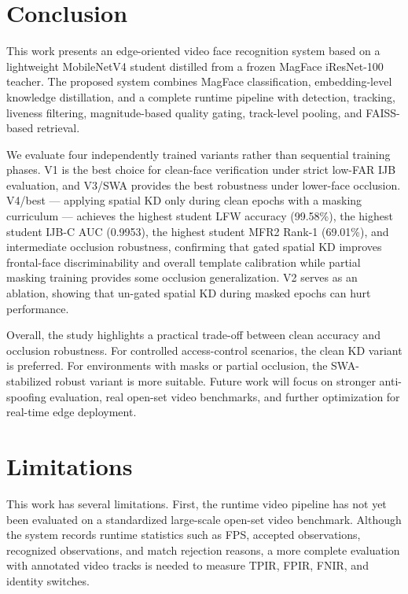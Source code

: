 \section{Conclusion}

This work presents an edge-oriented video face recognition system based on a lightweight MobileNetV4 student distilled from a frozen MagFace iResNet-100 teacher. The proposed system combines MagFace classification, embedding-level knowledge distillation, and a complete runtime pipeline with detection, tracking, liveness filtering, magnitude-based quality gating, track-level pooling, and FAISS-based retrieval\cite{mobilenetv4}\cite{relationalkd}\cite{hinton2015distilling}\cite{faiss}\cite{botsort}\cite{deepsort}.

We evaluate four independently trained variants rather than sequential training phases. V1 is the best choice for clean-face verification under strict low-FAR IJB evaluation, and V3/SWA provides the best robustness under lower-face occlusion. V4/best — applying spatial KD only during clean epochs with a masking curriculum — achieves the highest student LFW accuracy (99.58\%), the highest student IJB-C AUC (0.9953), the highest student MFR2 Rank-1 (69.01\%), and intermediate occlusion robustness, confirming that gated spatial KD improves frontal-face discriminability and overall template calibration while partial masking training provides some occlusion generalization. V2 serves as an ablation, showing that un-gated spatial KD during masked epochs can hurt performance\cite{izmailov2019averagingweightsleadswider}\cite{ijbb}\cite{ijbc}\cite{faiss}.

Overall, the study highlights a practical trade-off between clean accuracy and occlusion robustness. For controlled access-control scenarios, the clean KD variant is preferred. For environments with masks or partial occlusion, the SWA-stabilized robust variant is more suitable. Future work will focus on stronger anti-spoofing evaluation, real open-set video benchmarks, and further optimization for real-time edge deployment.

\section{Limitations}

This work has several limitations. First, the runtime video pipeline has not yet been evaluated on a standardized large-scale open-set video benchmark. Although the system records runtime statistics such as FPS, accepted observations, recognized observations, and match rejection reasons, a more complete evaluation with annotated video tracks is needed to measure TPIR, FPIR, FNIR, and identity switches.

